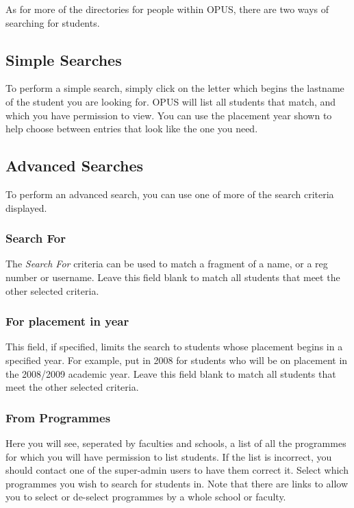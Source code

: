 \documentclass[12 pt]{book}
\begin{document}
As for more of the directories for people within OPUS, there are two ways of
searching for students.

\subsection{Simple Searches}

To perform a simple search, simply click on the letter which begins the lastname
of the student you are looking for. OPUS will list all students that match, and
which you have permission to view. You can use the placement year shown to help
choose between entries that look like the one you need.

\subsection{Advanced Searches}

To perform an advanced search, you can use one of more of the search criteria
displayed.


\subsubsection{Search For}

The \emph{Search For} criteria can be used to match a fragment of a name, or a
reg number or username. Leave this field blank to match all students that meet
the other selected criteria.

\subsubsection{For placement in year}

This field, if specified, limits the search to students whose placement begins
in a specified year. For example, put in 2008 for students who will be on
placement in the 2008/2009 academic year. Leave this field blank to match all
students that meet the other selected criteria.

\subsubsection{From Programmes}

Here you will see, seperated by faculties and schools, a list of all the
programmes for which you will have permission to list students. If the list
is incorrect, you should contact one of the super-admin users to have them
correct it. Select which programmes you wish to search for students in. Note
that there are links to allow you to select or de-select programmes by a whole
school or faculty.
\end{document}
